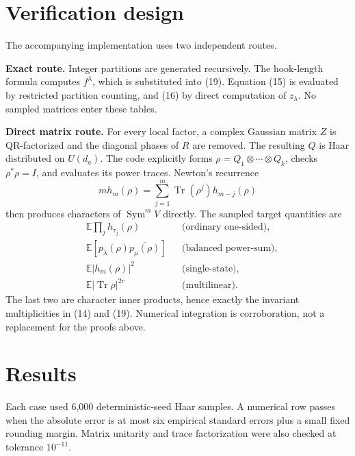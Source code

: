 \documentclass[11pt]{article}
\newcommand{\Sym}{\operatorname{Sym}}
\newcommand{\Tr}{\operatorname{Tr}}
\begin{document}
\section{Verification design}

The accompanying implementation uses two independent routes.

\textbf{Exact route.}
Integer partitions are generated recursively. The hook-length formula computes
$f^\lambda$, which is substituted into (19). Equation (15) is evaluated by
restricted partition counting, and (16) by direct computation of $z_\lambda$.
No sampled matrices enter these tables.

\textbf{Direct matrix route.}
For every local factor, a complex Gaussian matrix $Z$ is QR-factorized and the
diagonal phases of $R$ are removed. The resulting $Q$ is Haar distributed on
$U(d_a)$. The code explicitly forms
$\rho=Q_1\otimes\cdots\otimes Q_k$, checks $\rho^*\rho=I$, and evaluates its
power traces. Newton's recurrence
\begin{equation}
 mh_m(\rho)=\sum_{j=1}^m\Tr(\rho^j)h_{m-j}(\rho)
\end{equation}
then produces characters of $\Sym^mV$ directly. The sampled target quantities
are
\begin{align*}
 &\mathbb E\prod_jh_{\tau_j}(\rho) &&\text{(ordinary one-sided)},\\
 &\mathbb E[p_\lambda(\rho)\overline{p_\mu(\rho)}]
     &&\text{(balanced power-sum)},\\
 &\mathbb E|h_m(\rho)|^2 &&\text{(single-state)},\\
 &\mathbb E|\Tr\rho|^{2r} &&\text{(multilinear)}.
\end{align*}
The last two are character inner products, hence exactly the invariant
multiplicities in (14) and (19). Numerical integration is corroboration, not a
replacement for the proofs above.

\clearpage
\section{Results}

Each case used 6,000 deterministic-seed Haar samples. A numerical row passes
when the absolute error is at most six empirical standard errors plus a small
fixed rounding margin. Matrix unitarity and trace factorization were also
checked at tolerance $10^{-11}$.
\end{document}
